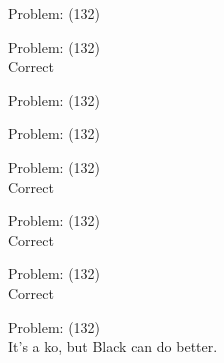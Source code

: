 \documentclass[11pt]{article}
\begin{document}
\begin{minipage}[t]{0.5\textwidth}
  {\centering
  
  Problem: (132)\\
  
  }
\end{minipage}
\begin{minipage}[t]{0.5\textwidth}
  {\centering
  
  Problem: (132)\\
  Correct\\
  }
\end{minipage}
\begin{minipage}[t]{0.5\textwidth}
  {\centering
  
  Problem: (132)\\
  
  }
\end{minipage}
\begin{minipage}[t]{0.5\textwidth}
  {\centering
  
  Problem: (132)\\
  
  }
\end{minipage}
\begin{minipage}[t]{0.5\textwidth}
  {\centering
  
  Problem: (132)\\
  Correct\\
  }
\end{minipage}
\begin{minipage}[t]{0.5\textwidth}
  {\centering
  
  Problem: (132)\\
  Correct\\
  }
\end{minipage}
\begin{minipage}[t]{0.5\textwidth}
  {\centering
  
  Problem: (132)\\
  Correct\\
  }
\end{minipage}
\begin{minipage}[t]{0.5\textwidth}
  {\centering
  
  Problem: (132)\\
  It's a ko, but Black can do better.\\
  }
\end{minipage}
\end{document}
